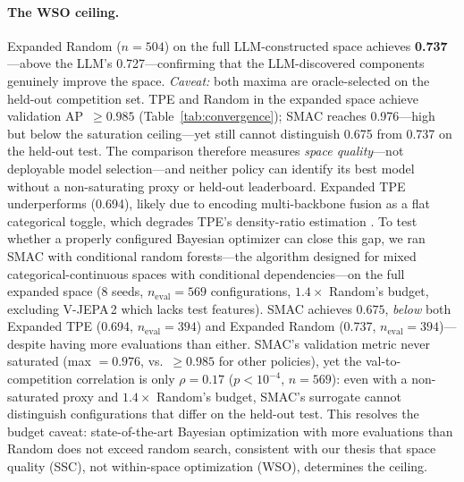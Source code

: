 \documentclass{article}
\begin{document}
\paragraph{The WSO ceiling.}
Expanded Random ($n = 504$) on the full LLM-constructed space achieves \textbf{0.737}---above the LLM's 0.727---confirming that the LLM-discovered components genuinely improve the space.
\emph{Caveat:} both maxima are oracle-selected on the held-out competition set.
TPE and Random in the expanded space achieve validation AP~$\ge 0.985$ (Table~\ref{tab:convergence}); SMAC reaches 0.976---high but below the saturation ceiling---yet still cannot distinguish 0.675 from 0.737 on the held-out test.
The comparison therefore measures \emph{space quality}---not deployable model selection---and neither policy can identify its best model without a non-saturating proxy or held-out leaderboard.
Expanded TPE underperforms (0.694), likely due to encoding multi-backbone fusion as a flat categorical toggle, which degrades TPE's density-ratio estimation \citep{bergstra2011algorithms}.
To test whether a properly configured Bayesian optimizer can close this gap, we ran SMAC \citep{hutter2011smac} with conditional random forests---the algorithm designed for mixed categorical-continuous spaces with conditional dependencies---on the full expanded space (8 seeds, $n_{\mathrm{eval}} = 569$ configurations, $1.4\times$ Random's budget, excluding V-JEPA\,2 which lacks test features).
SMAC achieves $\mathbf{0.675}$, \emph{below} both Expanded TPE (0.694, $n_{\mathrm{eval}} = 394$) and Expanded Random (0.737, $n_{\mathrm{eval}} = 394$)---despite having more evaluations than either.
SMAC's validation metric never saturated (max $= 0.976$, vs.\ $\ge 0.985$ for other policies), yet the val-to-competition correlation is only $\rho = 0.17$ ($p < 10^{-4}$, $n = 569$): even with a non-saturated proxy and $1.4\times$ Random's budget, SMAC's surrogate cannot distinguish configurations that differ on the held-out test.
This resolves the budget caveat: state-of-the-art Bayesian optimization with more evaluations than Random does not exceed random search, consistent with our thesis that space quality (SSC), not within-space optimization (WSO), determines the ceiling.
\end{document}
